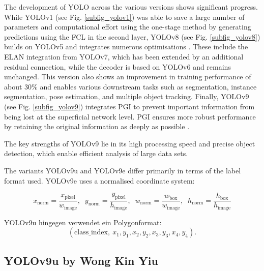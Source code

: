 The development of \acrshort{YOLO} across the various versions shows significant progress. While \acrshort{YOLO}v1 (see Fig. \ref{subfig_yolov1}) was able to save a large number of parameters and computational effort using the one-stage method by generating predictions using the \acrshort{FCL} in the second layer, \acrshort{YOLO}v8 (see Fig. \ref{subfig_yolov8}) builds on \acrshort{YOLO}v5 and integrates numerous optimisations \cite{Wang2024_yolo_review}. These include the \acrfull{ELAN} integration from \acrshort{YOLO}v7, which has been extended by an additional residual connection, while the decoder is based on \acrshort{YOLO}v6 and remains unchanged. This version also shows an improvement in training performance of about 30\% and enables various downstream tasks such as segmentation, instance segmentation, pose estimation, and multiple object tracking. Finally, \acrshort{YOLO}v9 (see Fig. \ref{subfig_yolov9}) integrates \acrshort{PGI} to prevent important information from being lost at the superficial network level. \acrshort{PGI} ensures more robust performance by retaining the original information as deeply as possible \cite{Wang2024_yolo_review}.

The key strengths of \acrshort{YOLO}v9 lie in its high processing speed and precise object detection, which enable efficient analysis of large data sets.
 
The variants \acrshort{YOLO}v9u and \acrshort{YOLO}v9e differ primarily in terms of the label format used. \acrshort{YOLO}v9e uses a normalised coordinate system:

\hypertarget{eq:yolov9}{}
\begin{equation}
x_\text{norm} = \frac{x_\text{pixel}}{w_\text{image}},\;\;
y_\text{norm} = \frac{y_\text{pixel}}{h_\text{image}},\;\;
w_\text{norm} = \frac{w_\text{box}}{w_\text{image}},\;\;
h_\text{norm} = \frac{h_\text{box}}{h_\text{image}}
\end{equation}
\label{Eq:yolov9}

\hypertarget{eq:yolov9u}{}
\acrshort{YOLO}v9u hingegen verwendet ein Polygonformat:
\begin{equation}
(\text{class\_index},\ x_1, y_1, x_2, y_2, x_3, y_3, x_4, y_4).
\end{equation}



\subsection{YOLOv9u by Wong Kin Yiu}
\label{subsec:yolov9u}

